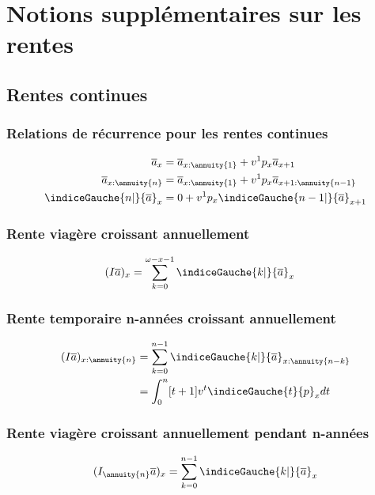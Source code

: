 
\chapter{Notions supplémentaires sur les rentes}

\section{Rentes continues}

\subsection{Relations de récurrence pour les rentes continues}
\begin{align*}
\overline{a}_x &= \overline{a}_{x:\annuity{1}} + v^1 p_x \overline{a}_{x+1} \\
\overline{a}_{x:\annuity{n}} &= \overline{a}_{x:\annuity{1}} + v^1 p_x \overline{a}_{x+1:\annuity{n-1}} \\
\indiceGauche{n|}{\overline{a}}_x &= 0 +  v^1 p_x \indiceGauche{n-1|}{\overline{a}}_{x+1} \\
\end{align*}

\subsection{Rente viagère croissant annuellement}
\begin{align*}
(I\overline{a})_x &= \sum_{k=0}^{\omega - x -1} \indiceGauche{k|}{\overline{a}}_x
\end{align*}

\subsection{Rente temporaire n-années croissant annuellement}
\begin{align*}
(I\overline{a})_{x:\annuity{n}} &= \sum_{k=0}^{n -1} \indiceGauche{k|}{\overline{a}}_{x:\annuity{n-k}} \\
&= \int_{0}^{n} [t+1]v^t \indiceGauche{t}{p}_x dt \\
\end{align*}

\subsection{Rente viagère croissant annuellement pendant n-années}
\begin{align*}
(I_{\annuity{n}}\overline{a})_{x} &= \sum_{k=0}^{n -1} \indiceGauche{k|}{\overline{a}}_{x} \\
\end{align*}

